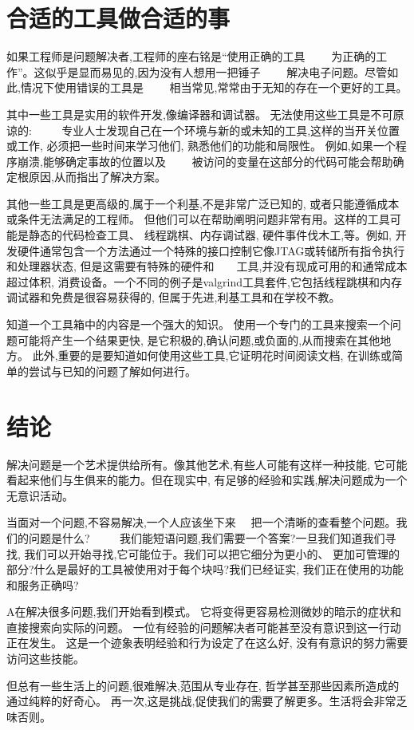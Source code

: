 \section*{合适的工具做合适的事}

如果工程师是问题解决者,工程师的座右铭是“使用正确的工具　　
为正确的工作”。这似乎是显而易见的,因为没有人想用一把锤子　　
解决电子问题。尽管如此,情况下使用错误的工具是　　
相当常见,常常由于无知的存在一个更好的工具。

其中一些工具是实用的软件开发,像编译器和调试器。
无法使用这些工具是不可原谅的: 　　
专业人士发现自己在一个环境与新的或未知的工具,这样的当开关位置或工作,
必须把一些时间来学习他们, 熟悉他们的功能和局限性。
例如,如果一个程序崩溃,能够确定事故的位置以及　　
被访问的变量在这部分的代码可能会帮助确定根原因,从而指出了解决方案。

其他一些工具是更高级的,属于一个利基,不是非常广泛已知的,
或者只能遵循成本或条件无法满足的工程师。
但他们可以在帮助阐明问题非常有用。这样的工具可能是静态的代码检查工具、
线程跳棋、内存调试器, 硬件事件伐木工,等。例如,
开发硬件通常包含一个方法通过一个特殊的接口控制它像JTAG或转储所有指令执行和处理器状态,
但是这需要有特殊的硬件和　　工具,并没有现成可用的和通常成本超过体积, 
消费设备。一个不同的例子是valgrind工具套件,它包括线程跳棋和内存调试器和免费是很容易获得的, 
但属于先进,利基工具和在学校不教。

知道一个工具箱中的内容是一个强大的知识。
使用一个专门的工具来搜索一个问题可能将产生一个结果更快,
是它积极的,确认问题,或负面的,从而搜索在其他地方。
此外,重要的是要知道如何使用这些工具,它证明花时间阅读文档,
在训练或简单的尝试与已知的问题了解如何进行。

\section*{ 结论}

解决问题是一个艺术提供给所有。像其他艺术,有些人可能有这样一种技能,
它可能看起来他们与生俱来的能力。但在现实中,
有足够的经验和实践,解决问题成为一个无意识活动。

当面对一个问题,不容易解决,一个人应该坐下来　
把一个清晰的查看整个问题。我们的问题是什么? 　　
我们能短语问题,我们需要一个答案?一旦我们知道我们寻找,
我们可以开始寻找,它可能位于。我们可以把它细分为更小的、
更加可管理的部分?什么是最好的工具被使用对于每个块吗?我们已经证实,
我们正在使用的功能和服务正确吗?

A在解决很多问题,我们开始看到模式。
它将变得更容易检测微妙的暗示的症状和直接搜索向实际的问题。
一位有经验的问题解决者可能甚至没有意识到这一行动正在发生。
这是一个迹象表明经验和行为设定了在这么好,
没有有意识的努力需要访问这些技能。

但总有一些生活上的问题,很难解决,范围从专业存在,
哲学甚至那些因素所造成的通过纯粹的好奇心。
再一次,这是挑战,促使我们的需要了解更多。生活将会非常乏味否则。
